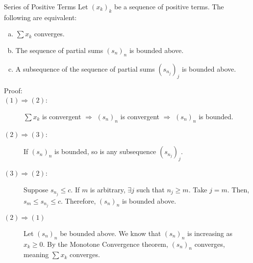 \documentclass[10pt]{extarticle}
\begin{document}
  \begin{problem}{Series of Positive Terms}
    Let $(x_k)_k$ be a sequence of positive terms. The following are equivalent:
    \begin{enumerate}[(a)]
      \item $\sum x_k$ converges.
      \item The sequence of partial sums $(s_n)_n$ is bounded above.
      \item A subsequence of the sequence of partial sums $(s_{n_j})_j$ is bounded above.
    \end{enumerate}
    \begin{description}
      \item[Proof:] \hfill
      \item[$(1) \Rightarrow (2)$:] $\sum x_k$ is convergent $\Rightarrow$ $(s_n)_n$ is convergent $\Rightarrow$ $(s_n)_n$ is bounded.
      \item[$(2) \Rightarrow (3)$:] If $(s_n)_n$ is bounded, so is any subsequence $(s_{n_j})_j$.
      \item[$(3) \Rightarrow (2)$:] Suppose $s_{n_j} \leq c$. If $m$ is arbitrary, $\exists j$ such that $n_j \geq m$. Take $j = m$. Then, $s_{m} \leq s_{n_j} \leq c$. Therefore, $(s_n)_n$ is bounded above.
      \item[$(2) \Rightarrow (1)$] Let $(s_n)_n$ be bounded above. We know that $(s_n)_n$ is increasing as $x_k \geq 0$. By the Monotone Convergence theorem, $(s_n)_n$ converges, meaning $\sum x_k$ converges.
    \end{description}
  \end{problem}
\end{document}
